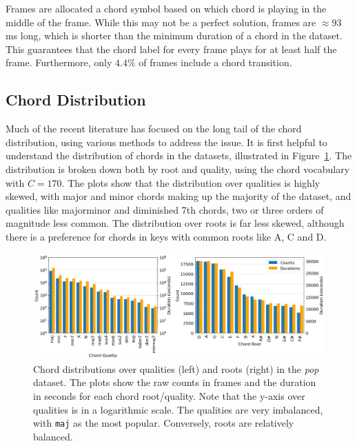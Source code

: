 Frames are allocated a chord symbol based on which chord is playing in the middle of the frame. While this may not be a perfect solution, frames are $\approx93$ms long, which is shorter than the minimum duration of a chord in the dataset. This guarantees that the chord label for every frame plays for at least half the frame. Furthermore, only $4.4\%$ of frames include a chord transition.

\subsection{Chord Distribution}

Much of the recent literature has focused on the long tail of the chord distribution, using various methods to address the issue. It is first helpful to understand the distribution of chords in the datasets, illustrated in Figure~\ref{fig:chord-distribution}. The distribution is broken down both by root and quality, using the chord vocabulary with $C=170$. The plots show that the distribution over qualities is highly skewed, with major and minor chords making up the majority of the dataset, and qualities like majorminor and diminished 7th chords, two or three orders of magnitude less common. The distribution over roots is far less skewed, although there is a preference for chords in keys with common roots like A, C and D.

\begin{figure}[H]
    \centering
    \includegraphics[width=1.0\textwidth]{figures/chord_distribution.png}
    \caption{Chord distributions over qualities (left) and roots (right) in the \emph{pop} dataset. The plots show the raw counts in frames and the duration in seconds for each chord root/quality. Note that the y-axis over qualities is in a logarithmic scale. The qualities are very imbalanced, with \texttt{maj} as the most popular. Conversely, roots are relatively balanced.}\label{fig:chord-distribution}
\end{figure}



